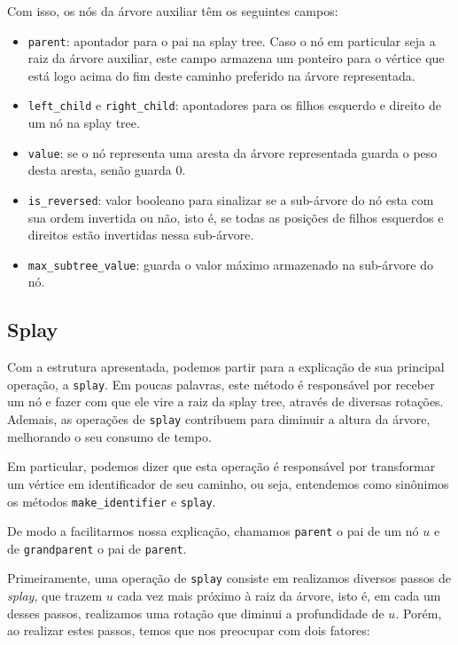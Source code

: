 Com isso, os nós da árvore auxiliar têm os seguintes campos:

\begin{itemize}
    \item \texttt{parent}: apontador para o pai na splay tree. Caso o nó em particular seja a raiz da árvore auxiliar, este campo armazena um ponteiro para o vértice que está logo acima do fim deste caminho preferido na árvore representada.
    \item \texttt{left\_child} e \texttt{right\_child}: apontadores para os filhos esquerdo e direito de um nó na splay tree.
    \item \texttt{value}: se o nó representa uma aresta da árvore representada guarda o peso desta aresta, senão guarda 0.
    \item \texttt{is\_reversed}: valor booleano para sinalizar se a sub-árvore do nó esta com sua ordem invertida ou não, isto é, se todas as posições de filhos esquerdos e direitos estão  invertidas nessa  sub-árvore.
    \item \texttt{max\_subtree\_value}: guarda o valor máximo armazenado na sub-árvore do nó.
\end{itemize}

\subsection{Splay}
\label{subsection:lct-splay-splay}

Com a estrutura apresentada, podemos partir para a explicação de sua principal operação, a \texttt{splay}. Em poucas palavras, este método é responsável por receber um nó e fazer com que ele vire a raiz da splay tree, através de diversas rotações.  Ademais, as operações de \texttt{splay} contribuem para diminuir a altura da árvore, melhorando o seu consumo de tempo.

Em particular, podemos dizer que esta operação é responsável por transformar um vértice em identificador de seu caminho, ou seja, entendemos como sinônimos os métodos \texttt{make\_identifier} e \texttt{splay}.

De modo a facilitarmos nossa explicação, chamamos \texttt{parent} o pai de um nó $u$ e de \texttt{grandparent} o pai de \texttt{parent}.

Primeiramente, uma operação de \texttt{splay} consiste em realizamos diversos passos de \emph{splay}, que trazem $u$ cada vez mais próximo à raiz da árvore, isto é, em cada um desses passos, realizamos uma rotação que diminui a profundidade de $u$. Porém, ao realizar estes passos, temos que nos preocupar com dois fatores:


